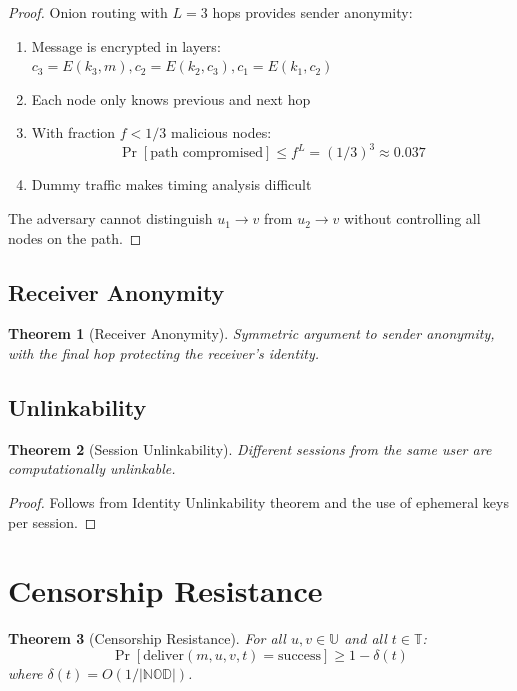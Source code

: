 \documentclass[11pt,a4paper]{article}
\newtheorem{theorem}{Theorem}[section]
\begin{document}
\begin{proof}
Onion routing with $L = 3$ hops provides sender anonymity:

\begin{enumerate}
    \item Message is encrypted in layers: $c_3 = E(k_3, m), c_2 = E(k_2, c_3), c_1 = E(k_1, c_2)$
    
    \item Each node only knows previous and next hop
    
    \item With fraction $f < 1/3$ malicious nodes:
    $$\Pr[\text{path compromised}] \leq f^L = (1/3)^3 \approx 0.037$$
    
    \item Dummy traffic makes timing analysis difficult
\end{enumerate}

The adversary cannot distinguish $u_1 \rightarrow v$ from $u_2 \rightarrow v$ without controlling all nodes on the path.
\end{proof}

\subsection{Receiver Anonymity}

\begin{theorem}[Receiver Anonymity]
Symmetric argument to sender anonymity, with the final hop protecting the receiver's identity.
\end{theorem}

\subsection{Unlinkability}

\begin{theorem}[Session Unlinkability]
Different sessions from the same user are computationally unlinkable.
\end{theorem}

\begin{proof}
Follows from Identity Unlinkability theorem and the use of ephemeral keys per session.
\end{proof}

\section{Censorship Resistance}

\begin{theorem}[Censorship Resistance]
For all $u, v \in \mathbb{U}$ and all $t \in \mathbb{T}$:
$$\Pr[\text{deliver}(m, u, v, t) = \text{success}] \geq 1 - \delta(t)$$
where $\delta(t) = O(1/|\mathbb{NOD}|)$.
\end{theorem}
\end{document}
